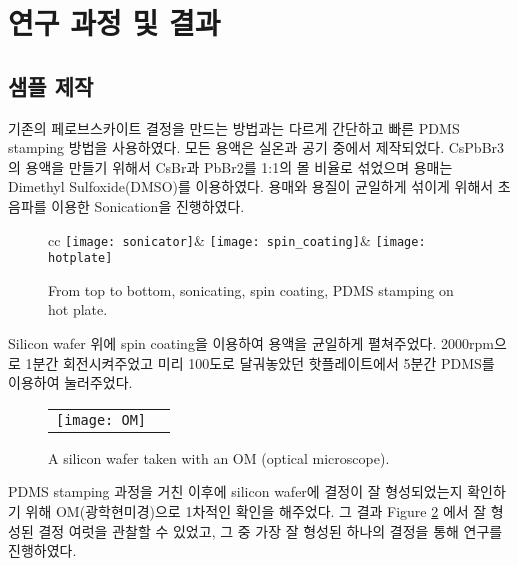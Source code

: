 \section{연구 과정 및 결과}

\subsection{샘플 제작}
기존의 페로브스카이트 결정을 만드는 방법과는 다르게 간단하고 빠른 PDMS stamping 방법을 사용하였다.
모든 용액은 실온과 공기 중에서 제작되었다. CsPbBr3의 용액을 만들기 위해서 CsBr과 PbBr2를 1:1의 몰 비율로 섞었으며 용매는 Dimethyl Sulfoxide(DMSO)를 이용하였다. 용매와 용질이 균일하게 섞이게 위해서 초음파를 이용한 Sonication을 진행하였다.
\begin{figure}[H]
	\begin{center}
		\begin{tabular}{cc}
			\texttt{[image: sonicator]}&
			\texttt{[image: spin\_coating]}&
			\texttt{[image: hotplate]}
		\end{tabular}
	\end{center}
	\caption{From top to bottom, sonicating, spin coating, PDMS stamping on hot plate.}
	\label{fig:sample}  
\end{figure}


Silicon wafer 위에 spin coating을 이용하여 용액을 균일하게 펼쳐주었다. 2000rpm으로 1분간 회전시켜주었고 미리 100도로 달궈놓았던 핫플레이트에서 5분간 PDMS를 이용하여 눌러주었다.
\begin{figure}[H]
	\begin{center}
		\begin{tabular}{cc}
			\texttt{[image: OM]}
		\end{tabular}
	\end{center}
	\caption{A silicon wafer taken with an OM (optical microscope).}
	\label{fig:om}  
\end{figure}
PDMS stamping 과정을 거친 이후에 silicon wafer에 결정이 잘 형성되었는지 확인하기 위해 OM(광학현미경)으로 1차적인 확인을 해주었다. 그 결과 Figure \ref{fig:om} 에서 잘 형성된 결정 여럿을 관찰할 수 있었고, 그 중 가장 잘 형성된 하나의 결정을 통해 연구를 진행하였다.


